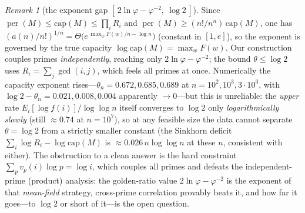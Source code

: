 \documentclass[11pt]{article}
\theoremstyle{remark}\newtheorem{remark}[theorem]{Remark}
\DeclareMathOperator{\perm}{per}
\begin{document}
\begin{remark}[{the exponent gap $[\,2\ln\varphi-\varphi^{-2},\ \log2\,]$}]
Since $\perm(M)\le\mathrm{cap}(M)\le\prod_iR_i$ and $\perm(M)\ge(n!/n^n)\,
\mathrm{cap}(M)$, one has $(a(n)/n!)^{1/n}=\Theta\big(e^{\,\max_wF(w)/n-\log n}\big)$
(constant in $[1,e]$), so the exponent is governed by the true capacity
$\log\mathrm{cap}(M)=\max_wF(w)$. Our construction couples primes
\emph{independently}, reaching only $2\ln\varphi-\varphi^{-2}$; the bound
$\theta\le\log2$ uses $R_i=\sum_j\gcd(i,j)$, which feels all primes at once.
Numerically the capacity exponent rises---$\theta_n=0.672,0.685,0.689$ at
$n=10^2,10^3,3\!\cdot\!10^3$, with $\log2-\theta_n=0.021,0.008,0.004$ apparently
$\to0$---but this is unreliable: the \emph{upper} rate $E_i[\log f(i)]/\log\log n$
itself converges to $\log2$ only \emph{logarithmically slowly} (still $\approx0.74$
at $n=10^7$), so at any feasible size the data cannot separate $\theta=\log2$
from a strictly smaller constant (the Sinkhorn deficit
$\sum_i\log R_i-\log\mathrm{cap}(M)$ is $\approx0.026\,n\log\log n$ at these $n$,
consistent with either). The
obstruction to a clean answer is the hard constraint $\sum_pv_p(i)\log p=\log i$,
which couples all primes and defeats the independent-prime (product) analysis:
the golden-ratio value $2\ln\varphi-\varphi^{-2}$ is the exponent of that
\emph{mean-field} strategy, cross-prime correlation provably beats it, and how
far it goes---to $\log2$ or short of it---is the open question.
\end{remark}
\end{document}

